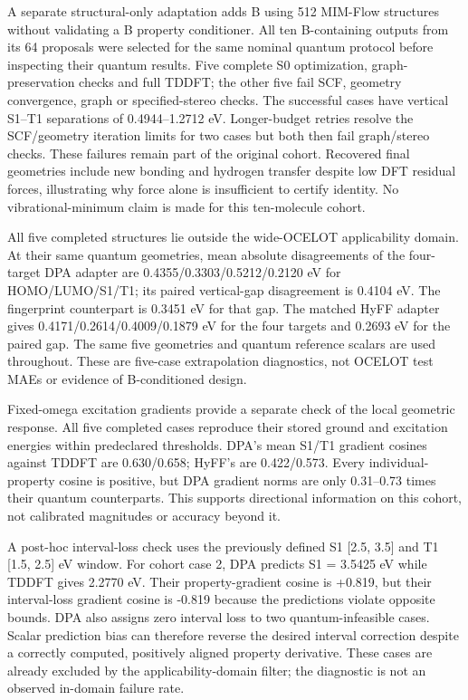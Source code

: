 \documentclass[11pt,a4paper]{article}
\begin{document}
A separate structural-only adaptation adds B using 512 MIM-Flow
structures without validating a B property conditioner. All ten
B-containing outputs from its 64 proposals were selected for the same
nominal quantum protocol before inspecting their quantum results. Five
complete S0 optimization, graph-preservation checks and full TDDFT; the
other five fail SCF, geometry convergence, graph or specified-stereo
checks. The successful cases have vertical S1--T1 separations of
0.4944--1.2712 eV. Longer-budget retries resolve the SCF/geometry
iteration limits for two cases but both then fail graph/stereo checks.
These failures remain part of the original cohort. Recovered final
geometries include new bonding and hydrogen transfer despite low DFT
residual forces, illustrating why force alone is insufficient to certify
identity. No vibrational-minimum claim is made for this ten-molecule
cohort.

All five completed structures lie outside the wide-OCELOT applicability
domain. At their same quantum geometries, mean absolute disagreements of
the four-target DPA adapter are 0.4355/0.3303/0.5212/0.2120 eV for
HOMO/LUMO/S1/T1; its paired vertical-gap disagreement is 0.4104 eV. The
fingerprint counterpart is 0.3451 eV for that gap. The matched HyFF
adapter gives 0.4171/0.2614/0.4009/0.1879 eV for the four targets and
0.2693 eV for the paired gap. The same five geometries and quantum
reference scalars are used throughout. These are five-case extrapolation
diagnostics, not OCELOT test MAEs or evidence of B-conditioned design.

Fixed-omega excitation gradients provide a separate check of the local
geometric response. All five completed cases reproduce their stored
ground and excitation energies within predeclared thresholds. DPA's mean
S1/T1 gradient cosines against TDDFT are 0.630/0.658; HyFF's are
0.422/0.573. Every individual-property cosine is positive, but DPA
gradient norms are only 0.31--0.73 times their quantum counterparts.
This supports directional information on this cohort, not calibrated
magnitudes or accuracy beyond it.

A post-hoc interval-loss check uses the previously defined S1 {[}2.5,
3.5{]} and T1 {[}1.5, 2.5{]} eV window. For cohort case 2, DPA predicts
S1 = 3.5425 eV while TDDFT gives 2.2770 eV. Their property-gradient
cosine is +0.819, but their interval-loss gradient cosine is -0.819
because the predictions violate opposite bounds. DPA also assigns zero
interval loss to two quantum-infeasible cases. Scalar prediction bias
can therefore reverse the desired interval correction despite a
correctly computed, positively aligned property derivative. These cases
are already excluded by the applicability-domain filter; the diagnostic
is not an observed in-domain failure rate.
\end{document}
